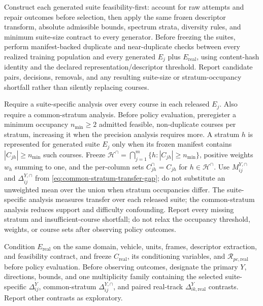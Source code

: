 Construct each generated suite feasibility-first: account for raw attempts and repair
outcomes before selection, then apply the same frozen descriptor transform, absolute
admissible bounds, spectrum strata, diversity rules, and minimum suite-size contract
to every generator. Before freezing the suites, perform manifest-backed duplicate and
near-duplicate checks between every realized training population and every generated
$E_j$ plus $E_{\mathrm{real}}$, using content-hash identity and the declared
representation/descriptor threshold. Report candidate pairs, decisions, removals,
and any resulting suite-size or stratum-occupancy shortfall rather than silently
replacing courses.

Require a suite-specific analysis over every course in each released $E_j$. Also
require a common-stratum analysis. Before policy evaluation, preregister a minimum
occupancy $n_{\min}\geq2$ admitted feasible, non-duplicate courses per stratum,
increasing it when the precision analysis requires more. A stratum $h$ is represented
for generated suite $E_j$ only when its frozen manifest contains
$|C_{jh}|\geq n_{\min}$ such courses. Freeze
$\mathcal{H}^{\cap}=\bigcap_{j=1}^{m}\{h:|C_{jh}|\geq n_{\min}\}$, positive
weights $w_h$ summing to one, and the per-column sets
$C^{\cap}_{jh}=C_{jh}$ for $h\in\mathcal{H}^{\cap}$. Use
$M^{Y,\cap}_{ij}$ and $\Delta^{Y,\cap}_{ij}$ from
\cref{eq:common-stratum-transfer-gap}; do not substitute an unweighted mean over the
union when stratum occupancies differ. The suite-specific analysis measures transfer
over each released suite; the common-stratum analysis reduces support and difficulty
confounding. Report every missing stratum and insufficient-course shortfall; do not
relax the occupancy threshold, weights, or course sets after observing policy
outcomes.

Condition $E_{\mathrm{real}}$ on the same domain, vehicle, units, frames, descriptor
extraction, and feasibility contract, and freeze $C_{\mathrm{real}}$, its conditioning
variables, and $\mathcal{R}_{pc,\mathrm{real}}$ before policy evaluation. Before
observing outcomes, designate the primary $Y$, directions, bounds, and one multiplicity
family containing the selected suite-specific $\Delta^Y_{ij}$, common-stratum
$\Delta^{Y,\cap}_{ij}$, and paired real-track
$\Delta^Y_{ik,\mathrm{real}}$ contrasts. Report other contrasts as exploratory.

